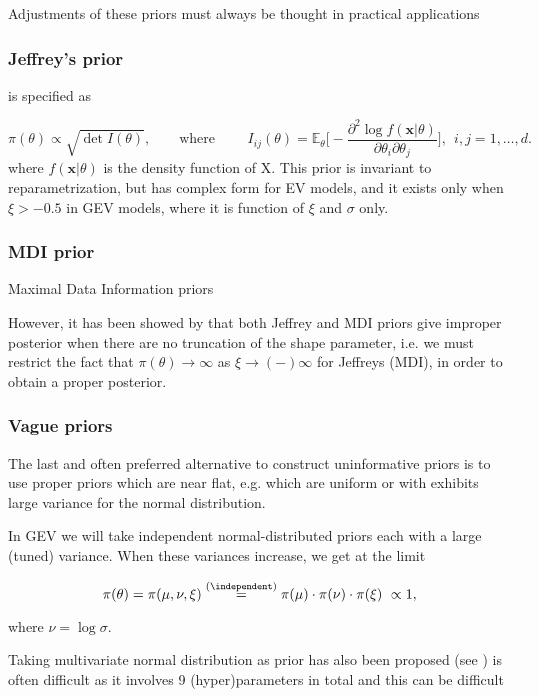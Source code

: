 Adjustments of these priors must always be thought in practical applications
\subsubsection*{Jeffrey's prior} 
is specified as 

\begin{equation}
\pi(\theta)\propto \sqrt{\det I(\theta)}, \qquad \text{where }\quad\quad I_{ij}(\theta)=\mathbb{E}_{\theta}\Bigg[-\frac{\partial^2\log f(\boldsymbol{x}|\theta)}{\partial\theta_i\partial\theta_j}\Bigg], \ \ i,j= 1,\dots,d.
\end{equation}
where $f(\boldsymbol{x}|\theta)$ is the density function of X.
This prior is invariant to reparametrization, but has complex form for EV models, and it exists only when $\xi>-0.5$ in GEV models, where it is function of $\xi$ and $\sigma$ only.


\subsubsection*{MDI prior}
Maximal Data Information priors


However, it has been showed by \cite{northrop_posterior_2016} that 
both Jeffrey and MDI priors give improper posterior when there are no truncation of the shape parameter, i.e. we must restrict the fact that $\pi(\theta)\rightarrow\infty$ as $\xi\rightarrow(-)\infty$ for Jeffreys (MDI), in order to obtain a proper posterior.

\subsubsection*{Vague priors}
The last and often preferred alternative to construct uninformative priors is to use proper priors which are near flat, e.g. which are uniform or with exhibits large variance for the normal distribution.

In GEV we will take independent normal-distributed priors each with a large (tuned) variance. When these variances increase, we get at the limit

\begin{equation}
\pi(\theta)=\pi(\mu,\nu,\xi)\stackrel{(\independent)}{=}\pi(\mu)\cdot\pi(\nu)\cdot\pi(\xi)\ \propto 1,
\end{equation}

where $\nu= \log\sigma$.

Taking multivariate normal distribution as prior has also been proposed (see ) is often difficult as it involves 9 (hyper)parameters in total and this can be difficult 


